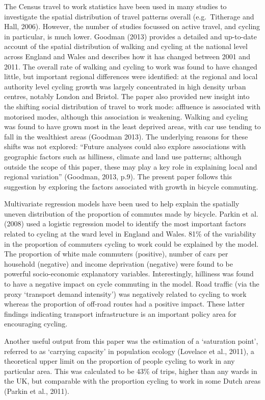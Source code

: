 The Census travel to work statistics have been used in many studies to
investigate the spatial distribution of travel patterns overall
(e.g.~Titherage and Hall, 2006). However, the number of studies focussed
on active travel, and cycling in particular, is much lower. Goodman
(2013) provides a detailed and up-to-date account of the spatial
distribution of walking and cycling at the national level across England
and Wales and describes how it has changed between 2001 and 2011. The
overall rate of walking and cycling to work was found to have changed
little, but important regional differences were identified: at the
regional and local authority level cycling growth was largely
concentrated in high density urban centres, notably London and Bristol.
The paper also provided new insight into the shifting social
distribution of travel to work mode: affluence is associated with
motorised modes, although this association is weakening. Walking and
cycling was found to have grown most in the least deprived areas, with
car use tending to fall in the wealthiest areas (Goodman 2013). The
underlying reasons for these shifts was not explored: ``Future analyses
could also explore associations with geographic factors such as
hilliness, climate and land use patterns; although outside the scope of
this paper, these may play a key role in explaining local and regional
variation'' (Goodman, 2013, p.9). The present paper follows this
suggestion by exploring the factors associated with growth in bicycle
commuting.

Multivariate regression models have been used to help explain the
spatially uneven distribution of the proportion of commutes made by
bicycle. Parkin et al. (2008) used a logistic regression model to
identify the most important factors related to cycling at the ward level
in England and Wales. 81\% of the variability in the proportion of
commuters cycling to work could be explained by the model. The
proportion of white male commuters (positive), number of cars per
household (negative) and income deprivation (negative) were found to be
powerful socio-economic explanatory variables. Interestingly, hilliness
was found to have a negative impact on cycle commuting in the model.
Road traffic (via the proxy `transport demand intensity') was negatively
related to cycling to work whereas the proportion of off-road routes had
a positive impact. These latter findings indicating transport
infrastructure is an important policy area for encouraging cycling.

Another useful output from this paper was the estimation of a
`saturation point', referred to as `carrying capacity' in population
ecology (Lovelace et al., 2011), a theoretical upper limit on the
proportion of people cycling to work in any particular area. This was
calculated to be 43\% of trips, higher than any wards in the UK, but
comparable with the proportion cycling to work in some Dutch areas
(Parkin et al., 2011).

